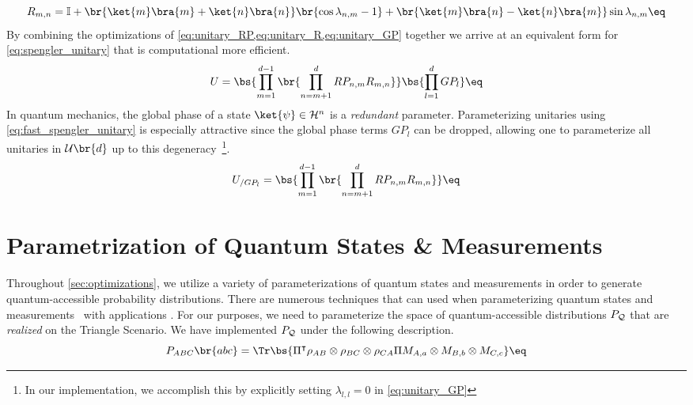 \documentclass[aps, 10pt, english, twoside, pra, nofootinbib, longbibliography]{revtex4-1}
\begin{document}
    \[ R_{m,n} = \mathbb{I} + \br{\ket{m}\bra{m} + \ket{n}\bra{n}} \br{\cos\lambda_{n,m} - 1} + \br{\ket{m}\bra{n} - \ket{n}\bra{m}} \sin\lambda_{n,m} \eq \label{eq:unitary_R} \]
    By combining the optimizations of \cref{eq:unitary_RP,eq:unitary_R,eq:unitary_GP} together we arrive at an equivalent form for \cref{eq:spengler_unitary} that is computational more efficient.
    \[ U = \bs{\prod_{m=1}^{d-1} \br{\prod_{n=m+1}^{d} RP_{n,m}R_{m,n}}} \tcdot \bs{\prod_{l=1}^{d} GP_l} \eq \label{eq:fast_spengler_unitary} \]
    In quantum mechanics, the global phase of a state $\ket{\psi} \in \Hilb^n$ is a \textit{redundant} parameter. Parameterizing unitaries using \cref{eq:fast_spengler_unitary} is especially attractive since the global phase terms $GP_l$ can be dropped, allowing one to parameterize all unitaries in $\mathcal{U}\br{d}$ up to this degeneracy~\cite{Spengler_2010_Unitary}\footnote{In our implementation, we accomplish this by explicitly setting $\lambda_{l,l} = 0$ in \cref{eq:unitary_GP}}.
    \[ U_{/ GP_l} = \bs{\prod_{m=1}^{d-1} \br{\prod_{n=m+1}^{d} RP_{n,m}R_{m,n}}} \eq \label{eq:fast_spengler_unitary_gp} \]

    \section{Parametrization of Quantum States \& Measurements}
    \label{sec:param_quantum_states}
    Throughout \cref{sec:optimizations}, we utilize a variety of parameterizations of quantum states and measurements in order to generate quantum-accessible probability distributions. There are numerous techniques that can used when parameterizing quantum states and measurements~\cite{Petz_2015, Hedemann_2013,Spengler_2010_Unitary,Fujii_2005,James_2001} with applications . For our purposes, we need to parameterize the space of quantum-accessible distributions $\prob[\mathcal{Q}]$ that are \textit{realized} on the Triangle Scenario. We have implemented $\prob[\mathcal{Q}]$ under the following description.
    \[ \prob[ABC]\br{abc} = \Tr\bs{\netperm^\intercal \rho_{AB}\otimes\rho_{BC}\otimes\rho_{CA} \netperm M_{A,a}\otimes M_{B,b} \otimes M_{C,c}} \eq \label{eq:triangle_quantum_distributions} \]
\end{document}
